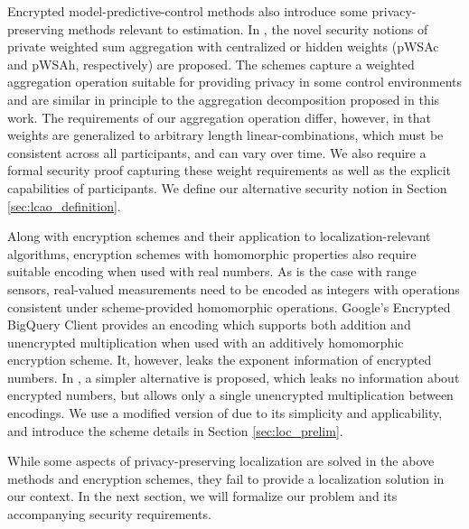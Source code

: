 \documentclass[10pt,letterpaper,oneside,twocolumn,journal]{IEEEtran}
\theoremstyle{definition}
\theoremstyle{definition}
\theoremstyle{remark}
\begin{document}
Encrypted model-predictive-control methods \cite{farokhiPrivacyDynamicalSystems2020} also introduce some privacy-preserving methods relevant to estimation. In \cite{alexandruEncryptedCooperativeControl2019,alexandruPrivateWeightedSum2020}, the novel security notions of private weighted sum aggregation with centralized or hidden weights (pWSAc and pWSAh, respectively) are proposed. The schemes capture a weighted aggregation operation suitable for providing privacy in some control environments and are similar in principle to the aggregation decomposition proposed in this work. The requirements of our aggregation operation differ, however, in that weights are generalized to arbitrary length linear-combinations, which must be consistent across all participants, and can vary over time. We also require a formal security proof capturing these weight requirements as well as the explicit capabilities of participants. We define our alternative security notion in Section \ref{sec:lcao_definition}.

Along with encryption schemes and their application to localization-relevant algorithms, encryption schemes with homomorphic properties also require suitable encoding when used with real numbers. As is the case with range sensors, real-valued measurements need to be encoded as integers with operations consistent under scheme-provided homomorphic operations. Google's Encrypted BigQuery Client \cite{googleEncryptedbigqueryclient2015} provides an encoding which supports both addition and unencrypted multiplication when used with an additively homomorphic encryption scheme. It, however, leaks the exponent information of encrypted numbers. In \cite{farokhiSecurePrivateControl2017}, a simpler alternative is proposed, which leaks no information about encrypted numbers, but allows only a single unencrypted multiplication between encodings. We use a modified version of \cite{farokhiSecurePrivateControl2017} due to its simplicity and applicability, and introduce the scheme details in Section \ref{sec:loc_prelim}.

While some aspects of privacy-preserving localization are solved in the above methods and encryption schemes, they fail to provide a localization solution in our context. In the next section, we will formalize our problem and its accompanying security requirements.

% 
%                                                                                
%                                                                                
%                                                                                
% 
\end{document}
